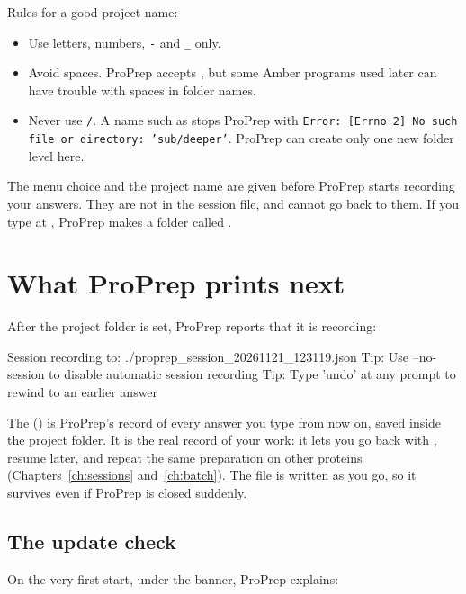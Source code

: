 Rules for a good project name:
\begin{itemize}
  \item Use letters, numbers, \texttt{-} and \texttt{\_} only.
  \item Avoid spaces. ProPrep accepts , but some Amber
  programs used later can have trouble with spaces in folder names.
  \item Never use \texttt{/}. A name such as  stops ProPrep
  with \texttt{Error: [Errno 2] No such file or directory: 'sub/deeper'}.
  ProPrep can create only one new folder level here.
\end{itemize}

\begin{watchout}
The menu choice and the project name are given before ProPrep starts recording
your answers. They are not in the session file, and  cannot go back
to them. If you type  at , ProPrep makes a
folder called .
\end{watchout}

\section{What ProPrep prints next}\label{sec:starting-next}

After the project folder is set, ProPrep reports that it is recording:

\begin{screen}
Session recording to: ./proprep_session_20261121_123119.json
Tip: Use --no-session to disable automatic session recording
Tip: Type 'undo' at any prompt to rewind to an earlier answer
\end{screen}

The  () is
ProPrep's record of every answer you type from now on, saved inside the project
folder. It is the real record of your work: it lets you go back with
, resume later, and repeat the same preparation on other proteins
(Chapters~\ref{ch:sessions} and~\ref{ch:batch}). The file is written as you go,
so it survives even if ProPrep is closed suddenly.

\subsection*{The update check}

On the very first start, under the banner, ProPrep explains:


